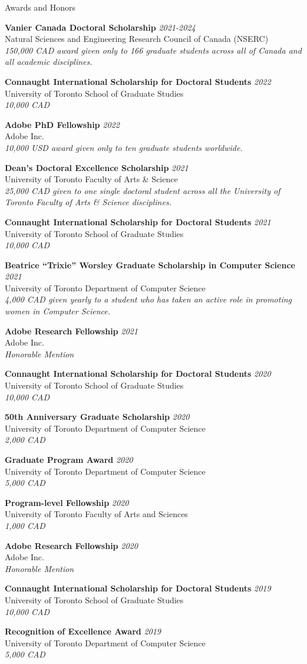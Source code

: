 \documentclass{resume}
\newcommand{\cvitembig}[4]{
    {\bf #1} \hfill {\em \small #2} \\ 
    {\small#3 }\\
    {\it \small #4}
}
\begin{document}
\begin{rSection}{Awards and Honors}

\cvitembig{Vanier Canada Doctoral Scholarship}{\em 2021-2024}{Natural Sciences and Engineering Research Council of Canada (NSERC)}{150,000 CAD award given only to 166 graduate students across all of Canada and all academic disciplines.}

\cvitembig{Connaught International Scholarship for Doctoral Students}{2022}{University of Toronto School of Graduate Studies}{10,000 CAD}

\cvitembig{Adobe PhD Fellowship}{2022}{Adobe Inc.}{10,000 USD award given only to ten graduate students worldwide.}

\cvitembig{Dean's Doctoral Excellence Scholarship}{2021}{University of Toronto Faculty of Arts \& Science}{25,000 CAD given to one single doctoral student across all the University of Toronto Faculty of Arts \& Science disciplines.}

\cvitembig{Connaught International Scholarship for Doctoral Students}{2021}{University of Toronto School of Graduate Studies}{10,000 CAD}

\cvitembig{Beatrice ``Trixie'' Worsley Graduate Scholarship in Computer Science}{2021}{University of Toronto Department of Computer Science}{4,000 CAD given yearly to a student who has taken an active role in promoting women in Computer Science.}

\cvitembig{Adobe Research Fellowship}{2021}{Adobe Inc.}{Honorable Mention}

\cvitembig{Connaught International Scholarship for Doctoral Students}{2020}{University of Toronto School of Graduate Studies}{10,000 CAD}

\cvitembig{50th Anniversary Graduate Scholarship}{2020}{University of Toronto Department of Computer Science}{2,000 CAD}

\cvitembig{Graduate Program Award}{2020}{University of Toronto Department of Computer Science}{5,000 CAD}

\cvitembig{Program-level Fellowship}{2020}{University of Toronto Faculty of Arts and Sciences}{1,000 CAD}

\cvitembig{Adobe Research Fellowship}{2020}{Adobe Inc.}{Honorable Mention}

\cvitembig{Connaught International Scholarship for Doctoral Students}{2019}{University of Toronto School of Graduate Studies}{10,000 CAD}

\cvitembig{Recognition of Excellence Award}{2019}{University of Toronto Department of Computer Science}{5,000 CAD}


\end{rSection}
\end{document}
